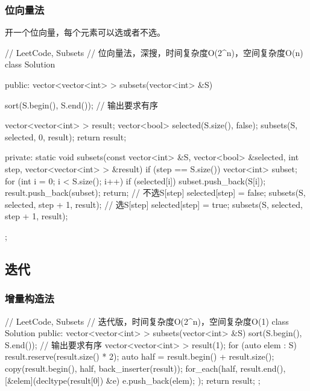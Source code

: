 \subsubsection{位向量法}
开一个位向量，每个元素可以选或者不选。

\begin{Code}
// LeetCode, Subsets
// 位向量法，深搜，时间复杂度O(2^n)，空间复杂度O(n)
class Solution {
public:
    vector<vector<int> > subsets(vector<int> &S) {
        sort(S.begin(), S.end());  // 输出要求有序

        vector<vector<int> > result;
        vector<bool> selected(S.size(), false);
        subsets(S, selected, 0, result);
        return result;
    }

private:
    static void subsets(const vector<int> &S, vector<bool> &selected, int step,
            vector<vector<int> > &result) {
        if (step == S.size()) {
            vector<int> subset;
            for (int i = 0; i < S.size(); i++) {
                if (selected[i]) subset.push_back(S[i]);
            }
            result.push_back(subset);
            return;
        }
        // 不选S[step]
        selected[step] = false;
        subsets(S, selected, step + 1, result);
        // 选S[step]
        selected[step] = true;
        subsets(S, selected, step + 1, result);
    }
};
\end{Code}


\subsection{迭代}


\subsubsection{增量构造法}
\begin{Code}
// LeetCode, Subsets
// 迭代版，时间复杂度O(2^n)，空间复杂度O(1)
class Solution {
public:
    vector<vector<int> > subsets(vector<int> &S) {
        sort(S.begin(), S.end()); // 输出要求有序
        vector<vector<int> > result(1);
        for (auto elem : S) {
            result.reserve(result.size() * 2);
            auto half = result.begin() + result.size();
            copy(result.begin(), half, back_inserter(result));
            for_each(half, result.end(), [&elem](decltype(result[0]) &e){
                e.push_back(elem);
            });
        }
        return result;
    }
};
\end{Code}



